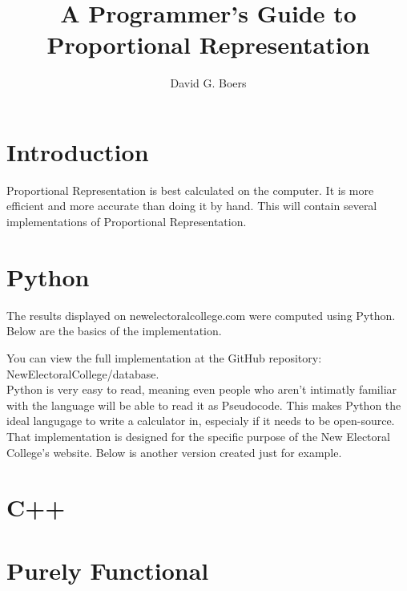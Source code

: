\documentclass{article}
\title{A Programmer's Guide to Proportional Representation}
\author{David G. Boers}
\begin{document}
    \maketitle
    
    \section{Introduction}

    Proportional Representation is best calculated on the computer. It is more efficient and more accurate than doing it by hand. This will contain several implementations of Proportional Representation.

    \section{Python}

    The results displayed on newelectoralcollege.com were computed using Python. Below are the basics of the implementation.

    

    You can view the full implementation at the GitHub repository: NewElectoralCollege/database.\\

    Python is very easy to read, meaning even people who aren't intimatly familiar with the language will be able to read it as Pseudocode. This makes Python the ideal langugage to write a calculator in, especialy if it needs to be open-source.\\

    That implementation is designed for the specific purpose of the New Electoral College's website. Below is another version created just for example.

    

    \section{C++}

    

    \section{Purely Functional}
\end{document}
